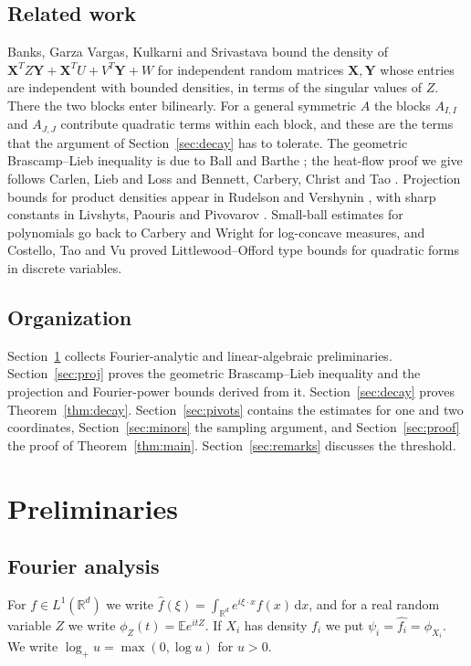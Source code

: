 \documentclass[11pt]{amsart}
\numberwithin{equation}{section}
\theoremstyle{definition}
\theoremstyle{remark}
\newcommand{\R}{\mathbb R}
\newcommand{\E}{\mathbb E}
\newcommand{\1}{\mathbf 1}
\newcommand{\dd}{\,\mathrm d}
\newcommand{\logp}{\log_+}
\begin{document}
\subsection*{Related work}
Banks, Garza Vargas, Kulkarni and Srivastava \cite[Theorem~2.1]{BGKS} bound the density of $\mathbf X^T Z\mathbf Y+\mathbf X^TU+V^T\mathbf Y+W$ for independent random matrices $\mathbf X,\mathbf Y$ whose entries are independent with bounded densities, in terms of the singular values of $Z$. There the two blocks enter bilinearly. For a general symmetric $A$ the blocks $A_{I,I}$ and $A_{J,J}$ contribute quadratic terms within each block, and these are the terms that the argument of Section~\ref{sec:decay} has to tolerate. The geometric Brascamp--Lieb inequality is due to Ball \cite{Ball} and Barthe \cite{Barthe}; the heat-flow proof we give follows Carlen, Lieb and Loss \cite{CLL} and Bennett, Carbery, Christ and Tao \cite{BCCT}. Projection bounds for product densities appear in Rudelson and Vershynin \cite{RV}, with sharp constants in Livshyts, Paouris and Pivovarov \cite{LPP}. Small-ball estimates for polynomials go back to Carbery and Wright \cite{CW} for log-concave measures, and Costello, Tao and Vu \cite{CTV} proved Littlewood--Offord type bounds for quadratic forms in discrete variables.

\subsection*{Organization}
Section~\ref{sec:prelim} collects Fourier-analytic and linear-algebraic preliminaries. Section~\ref{sec:proj} proves the geometric Brascamp--Lieb inequality and the projection and Fourier-power bounds derived from it. Section~\ref{sec:decay} proves Theorem~\ref{thm:decay}. Section~\ref{sec:pivots} contains the estimates for one and two coordinates, Section~\ref{sec:minors} the sampling argument, and Section~\ref{sec:proof} the proof of Theorem~\ref{thm:main}. Section~\ref{sec:remarks} discusses the threshold.

\section{Preliminaries}\label{sec:prelim}

\subsection{Fourier analysis}
For $f\in L^1(\R^d)$ we write $\widehat f(\xi)=\int_{\R^d}e^{i\xi\cdot x}f(x)\dd x$, and for a real random variable $Z$ we write $\phi_Z(t)=\E e^{itZ}$. If $X_i$ has density $f_i$ we put $\psi_i=\widehat{f_i}=\phi_{X_i}$. We write $\logp u=\max(0,\log u)$ for $u>0$.
\end{document}
